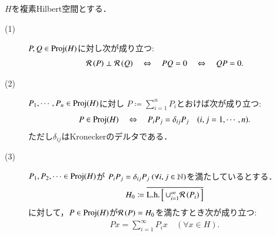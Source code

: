 	\begin{screen}
		\begin{prp}
			$H$を複素Hilbert空間とする．
			\begin{description}
				\item[(1)] $P,Q \in \mathrm{Proj}( H )$に対し次が成り立つ:
					\begin{align}
						\mathcal{R}\left(P\right) \perp \mathcal{R}\left(Q\right)
						\quad \Leftrightarrow \quad  PQ = 0
						\quad \Leftrightarrow \quad  QP = 0.
					\end{align}
				
				\item[(2)] 
					$P_1,\cdots,P_n \in \mathrm{Proj}( H )$に対し
					$P \coloneqq \sum_{i=1}^{n} P_i$とおけば次が成り立つ:
					\begin{align}
						P \in \mathrm{Proj}( H )
						\quad \Leftrightarrow \quad P_i P_j = \delta_{ij} P_j \quad (i,j = 1,\cdots,n).
					\end{align}
					ただし$\delta_{ij}$はKroneckerのデルタである．
				
				\item[(3)] 
					$P_1,P_2,\cdots \in \mathrm{Proj}( H )$が
					$P_i P_j = \delta_{ij} P_j \ (\forall i,j \in \mathbb{N})$を満たしているとする．
					\begin{align}
						H_0 \coloneqq \overline{\mathrm{L.h.}\left[\, \cup_{i=1}^{\infty}\mathcal{R}\left(P_i\right)\, \right]}
					\end{align}
					に対して，$P \in \mathrm{Proj}( H )$が$\mathcal{R}\left(P\right) = H_0$を満たすとき次が成り立つ:
					\begin{align}
						Px = \sum_{i=1}^{\infty} P_i x \quad (\forall x \in H).
					\end{align}
			\end{description}
			\label{prp:orthogonal_projection_product_sum}
		\end{prp}
	\end{screen}
	
